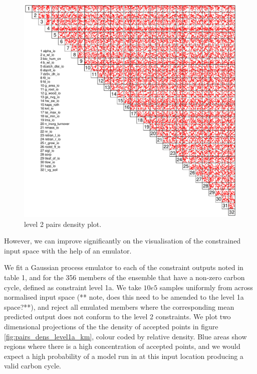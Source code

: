 \documentclass[gmd, manuscript]{copernicus}
\begin{document}
\begin{figure}[t]
\includegraphics[width=12cm]{./graphics/pairs_level2_inputs.pdf}
\caption{level 2 pairs density plot.}
\label{fig:pairs_level2_inputs}
\end{figure}

However, we can improve significantly on the visualisation of the constrained input space with the help of an emulator. 

We fit a Gaussian process emulator to each of the constraint outputs noted in table 1, and for the 356 members of the ensemble that have a non-zero carbon cycle, defined as constraint level 1a. We take $10e5$ samples uniformly from across normalised input space (** note, does this need to be amended to the level 1a space?**), and reject all emulated members where the corresponding mean predicted output does not conform to the level 2 constraints. We plot two dimensional projections of the the density of accepted points in figure \ref{fig:pairs_dens_level1a_km}, colour coded by relative density. Blue areas show regions where there is a high concentration of accepted points, and we would expect a high probability of a model run in at this input location producing a valid carbon cycle.
\end{document}
